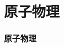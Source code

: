 \documentclass[../uem_phy_std_a.tex]{subfiles}
\begin{document}
\part{原子物理}

\section{原子物理}
\end{document}
